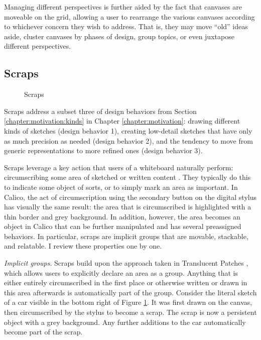 Managing different perspectives is further aided by the fact that canvases are moveable on the grid, allowing a user to rearrange the various canvases according to whichever concern they wish to address. That is, they may move ``old'' ideas aside, cluster canvases by phases of design, group topics, or even juxtapose different perspectives.

\subsection {Scraps}
\label{calico:3}

\begin{figure}
  \centering
 
\caption {Scraps}
\label{fig:5}       %
\end{figure}
%

Scraps address a subset three of design behaviors from Section \ref{chapter:motivation:kinds} in Chapter \ref{chapter:motivation}: drawing different kinds of sketches (design behavior 1), creating low-detail sketches that have only as much precision as needed (design behavior 2), and the tendency to move from generic representations to more refined ones (design behavior 3).

Scraps leverage a key action that users of a whiteboard naturally perform: circumscribing some area of sketched or written content \citep{Hendry}. They typically do this to indicate some object of sorts, or to simply mark an area as important. In Calico, the act of circumscription using the secondary button on the digital stylus has visually the same result: the area that is circumscribed is highlighted with a thin border and grey background. In addition, however, the area becomes an object in Calico that can be further manipulated and has several preassigned behaviors. In particular, scraps are implicit groups that are movable, stackable, and relatable. I review these properties one by one.

\emph{Implicit groups}. Scraps build upon the approach taken in Translucent Patches \citep{Kramer}, which allows users to explicitly declare an area as a group. Anything that is either entirely circumscribed in the first place or otherwise written or drawn in this area afterwards is automatically part of the group. Consider the literal sketch of a car visible in the bottom right of Figure \ref{fig:5}. It was first drawn on the canvas, then circumscribed by the stylus to become a scrap. The scrap is now a persistent object with a grey background. Any further additions to the car automatically become part of the scrap.

